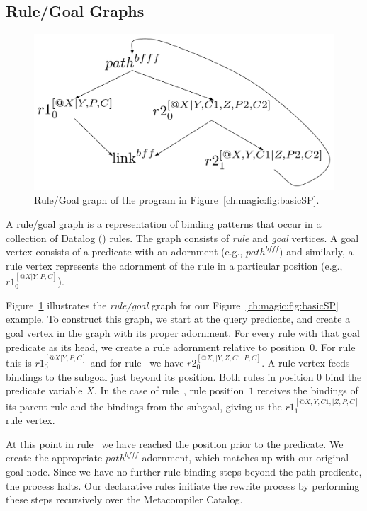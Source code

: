 \subsection{Rule/Goal Graphs}

\begin{figure}[!t]
\begin{center}
\includegraphics[scale=0.5]{figures/RuleGoalGraph}
\caption{\label{ch:magic:fig:rggraph}Rule/Goal graph of the program in Figure~\ref{ch:magic:fig:basicSP}.}
\end{center}
\end{figure}

A rule/goal graph is a representation of binding patterns that occur in a
collection of Datalog (\OVERLOG) rules.  The graph consists of {\em rule} and
{\em goal} vertices.  A goal vertex consists of a predicate with an adornment
(e.g., $path^{bfff}$) and similarly, a rule vertex represents the adornment of
the rule in a particular position (e.g., $r1_0^{[@X|Y,P,C]}$).

Figure~\ref{ch:magic:fig:rggraph} illustrates the {\em rule/goal} graph for our
Figure~\ref{ch:magic:fig:basicSP} example.  To construct this graph, we start
at the query predicate, and create a goal vertex in the graph with its proper
adornment.  For every rule with that goal predicate as its head, we create a
rule adornment relative to position~$0$.  For rule~ this is
$r1_0^{[@X|Y,P,C]}$ and for rule~ we have $r2_0^{[@X,|Y,Z,C1,P,C]}$.  A
rule vertex feeds bindings to the subgoal just beyond its position.  Both rules
in position $0$ bind the  predicate variable $X$.  In the case of
rule~, rule position~$1$ receives the bindings of its parent rule and
the bindings from the  subgoal, giving us the
$r1_1^{[@X,Y,C1,|Z,P,C]}$ rule vertex.

At this point in rule~ we have reached the position prior to the
 predicate.  We create the appropriate $path^{bfff}$ adornment, which
matches up with our original  goal node.  Since we have no further
rule binding steps beyond the path predicate, the process halts.  Our
declarative rules initiate the rewrite process by performing these steps
recursively over the Metacompiler Catalog.

